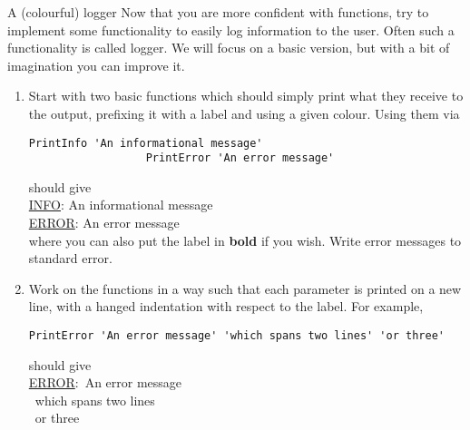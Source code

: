 
\begin{exercise}[Inspirational]{A (colourful) logger}
    Now that you are more confident with functions, try to implement some functionality to easily log information to the user.
    Often such a functionality is called logger.
    We will focus on a basic version, but with a bit of imagination you can improve it.
    \begin{enumerate}
        \item Start with two basic functions which should simply print what they receive to the output, prefixing it with a label and using a given colour.
              Using them via
              \begin{lstlisting}[style=MyBash]
                  PrintInfo 'An informational message'
                  PrintError 'An error message'
              \end{lstlisting}
              should give\\[0.3ex]
              {
                \ttfamily
                \hspace*{5mm}\color{ForestGreen}\underline{INFO}: An informational message\\
                \hspace*{5mm}\color{red}\underline{ERROR}: An error message\\[0.5ex]
              }
              where you can also put the label in \textbf{bold} if you wish.
              Write error messages to standard error.
        \item Work on the functions in a way such that each parameter is printed on a new line, with a hanged indentation with respect to the label.
              For example, 
              \begin{lstlisting}[style=MyBash]
                  PrintError 'An error message' 'which spans two lines' 'or three'
              \end{lstlisting}
              should give\\[0.3ex]
              {
                \ttfamily\color{red}
                \hspace*{5mm}\underline{ERROR}:~An error message\\
                \hspace*{5mm}~which spans two lines\\
                \hspace*{5mm}~or three
}
\end{enumerate}
\end{exercise}
